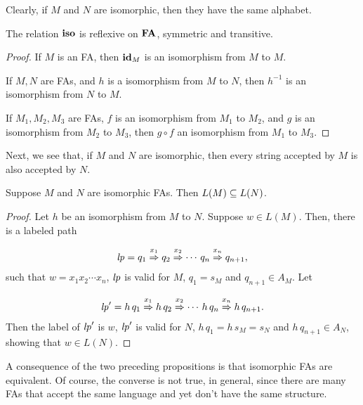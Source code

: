 Clearly, if $M$ and $N$ are isomorphic, then they have the same
alphabet.

\begin{proposition}
\label{IsoEquivProp}
The relation $\mathbin{\mathbf{iso}}$ is reflexive on $\mathbf{FA}$, symmetric and transitive.
%
%
%
%
%
%
\end{proposition}

\begin{proof}
If $M$ is an FA, then $\mathbf{id}_M$ is an isomorphism from $M$ to $M$.

If $M,N$ are FAs, and $h$ is a isomorphism from $M$ to $N$, then
$h^{-1}$ is an isomorphism from $N$ to $M$.

If $M_1,M_2,M_3$ are FAs, $f$ is an isomorphism from $M_1$ to $M_2$,
and $g$ is an isomorphism from $M_2$ to $M_3$, then $g\circ f$ an
isomorphism from $M_1$ to $M_3$.
\end{proof}

Next, we see that, if $M$ and $N$ are isomorphic, then
every string accepted by $M$ is also accepted by $N$.

\begin{proposition}
\label{IsoSubProp}
Suppose $M$ and $N$ are isomorphic FAs.  Then $L(M)\subseteq L(N)$.
\end{proposition}

\begin{proof}
Let $h$ be an isomorphism from $M$ to $N$.  Suppose $w\in L(M)$.
Then, there is a labeled path
\begin{gather*}
{\it lp} = q_1\stackrel{\strut x_1}{\Rightarrow}q_2\stackrel{\strut x_2}{\Rightarrow}\cdots\,q_n\stackrel{\strut x_n}{\Rightarrow}q_{n+1} ,
\end{gather*}
such that $w=x_1x_2\cdots x_n$, ${\it lp}$ is valid for $M$,
$q_1 = s_M$ and $q_{n+1}\in A_M$.  Let
\begin{gather*}
{\it lp}' = h\,q_1\stackrel{\strut x_1}{\Rightarrow}h\,q_2\stackrel{\strut x_2}{\Rightarrow}\cdots\,h\,q_n
\stackrel{\strut x_n}{\Rightarrow}h\,q_{n+1}.
\end{gather*}
Then the label of ${\it lp}'$ is $w$, ${\it lp}'$ is valid for $N$,
$h\,q_1=h\,s_M=s_N$ and $h\,q_{n+1}\in A_N$, showing that $w\in L(N)$.
\end{proof}

A consequence of the two preceding propositions is that
isomorphic FAs are equivalent.  Of course, the converse is
not true, in general, since there are many FAs that accept the
same language and yet don't have the same structure.

